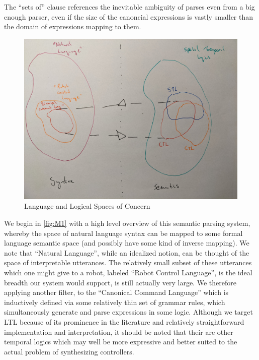 \documentclass[a4paper, 11pt]{article}
\begin{document}
The ``sets of'' clause
references the inevitable ambiguity of parses even from a big enough parser, even
if the size of the canoncial expressions is vastly smaller than the domain of
expressions mapping to them.

\begin{figure}[H]
\centering
\includegraphics[width=150mm]{pics/one.jpg}
\caption{Language and Logical Spaces of Concern} \label{fig:M1}
\end{figure}

We begin in \autoref{fig:M1} with a high level overview of this semantic parsing
system, whereby the space of natural language syntax can be mapped to some
formal language semantic space (and possibly have some kind of inverse mapping).
We note that ``Natural Language'', while an idealized notion, can be thought of
the space of interpretable utterances. The relatively small subset of these
utterances which one might give to a robot, labeled ``Robot Control Language'',
is the ideal breadth our system would support, is still actually very large. We
therefore applying another filter, to the ``Canonical Command Language'' which
is inductively defined via some relatively thin set of grammar rules, which
simultaneously generate and parse expressions in some logic. Although we target
LTL because of its prominence in the literature and relatively straightforward
implementation and interpretation, it should be noted that their are other
temporal logics which may well be more expressive and better suited to the
actual problem of synthesizing controllers.
\end{document}
